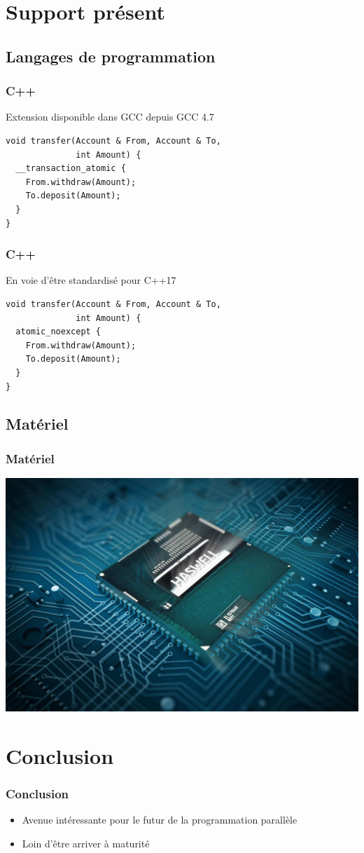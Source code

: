 \documentclass{beamer}
\begin{document}
\section{Support présent}
\subsection{Langages de programmation}
\begin{frame}[fragile]
\frametitle{C++}
Extension disponible dans GCC depuis GCC 4.7
\begin{lstlisting}
void transfer(Account & From, Account & To, 
              int Amount) {
  __transaction_atomic {
    From.withdraw(Amount);
    To.deposit(Amount);
  }
}
\end{lstlisting}
\end{frame}

\begin{frame}[fragile]
\frametitle{C++}
En voie d'être standardisé pour C++17
\begin{lstlisting}
void transfer(Account & From, Account & To, 
              int Amount) {
  atomic_noexcept {
    From.withdraw(Amount);
    To.deposit(Amount);
  }
}
\end{lstlisting}
\end{frame}

\subsection{Matériel}
\begin{frame}
\frametitle{Matériel}
\begin{center}
\colorbox{white}{\includegraphics[scale=0.15]{haswell.jpg}}
\end{center}
\end{frame}

\section{Conclusion}
\begin{frame}
\frametitle{Conclusion}
\begin{itemize}
\item Avenue intéressante pour le futur de la programmation parallèle
\item<2-> Loin d'être arriver à maturité
\end{itemize}
\end{frame}
\end{document}
